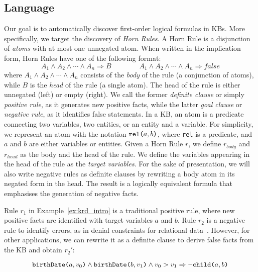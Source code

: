 \subsection{Language} \label{sec:krd_language} 
Our goal is to automatically discover first-order logical formulas in KBs. More specifically, we target the discovery of \emph{Horn Rules}. A Horn Rule is a disjunction of \emph{atoms} with at most one unnegated atom. When written in the implication form, Horn Rules have one of the following format:
%
\begin{equation*}
	A_1 \wedge A_2 \wedge \cdots \wedge A_n \Rightarrow B \qquad \qquad A_1 \wedge A_2 \wedge \cdots \wedge A_n \Rightarrow  false 
\end{equation*} %
%
where $A_1 \wedge A_2 \wedge \cdots \wedge A_n$ consists of the \emph{body} of the rule (a conjunction of atoms), while $B$ is the \emph{head} of the rule (a single atom). The head of the rule is either unnegated (left) or empty (right). We call the former \emph{definite clause} or simply \emph{positive rule}, as it generates new positive facts, while the latter \emph{goal clause} or \emph{negative rule}, as it identifies false statements. In a KB, an atom is a predicate connecting two variables, two entities, or an entity and a variable. For simplicity, we represent an atom with the notation $\texttt{rel(}a,b\texttt{)}$, where \texttt{rel} is a predicate, and $a$ and $b$ are either variables or entities. 
Given a Horn Rule $r$, we define $r_{body}$ and $r_{head}$ as the body and the head of the rule. We define the variables appearing in the head of the rule as the \emph{target variables}. 
For the sake of presentation, we will also write negative rules as definite clauses by rewriting a body atom in its negated form in the head. The result is a logically equivalent formula that emphasises the generation of negative facts.

\begin{example}\label{ex:ex2}
	Rule $r_1$ in Example~\ref{ex:krd_intro} is a traditional positive rule, where new positive facts are identified with target variables $a$ and $b$.
	Rule $r_2$ is a negative rule to identify errors, as in denial constraints for relational data~\cite{chu2013discovering}. However, for other applications, we can rewrite it as a definite clause to derive false facts from the KB and obtain $r_2'$:
	
	\vspace{-3.5ex}
	{\small	
		\begin{equation*}
			\texttt{birthDate(}a,v_0\texttt{)} \wedge \texttt{birthDate(}b,v_1\texttt{)} \wedge v_0 > v_1
			\Rightarrow  \neg \texttt{child(}a,b\texttt{)}  
		\end{equation*}
	}
	\vspace{-2.5ex}
\end{example} 

